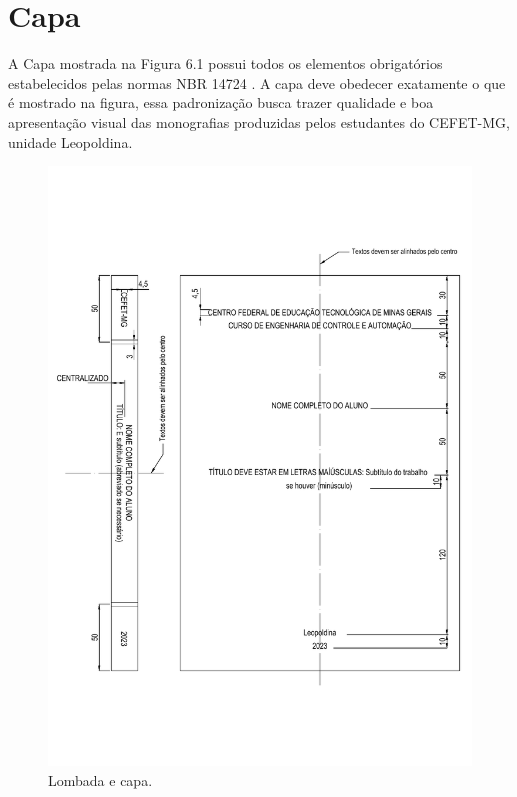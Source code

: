 \documentclass[
        oneside,      %
        english,			
        brazil			 
        ]{configcefetmglpd}
\begin{document}
\section{Capa}
A Capa mostrada na Figura 6.1 possui todos os elementos obrigatórios estabelecidos pelas normas NBR 14724 \cite{bib:abnt14724}. 
A capa deve obedecer exatamente o que é mostrado na figura, essa padronização busca trazer qualidade e boa apresentação visual das monografias produzidas pelos estudantes do CEFET-MG, unidade Leopoldina.

\begin{figure}[h]
	\larguratexto{15cm}  %
	\caption{Lombada e capa.}
	\label{fig:lombada}
	\begin{center}
		\includegraphics[width=15cm]{lombada.pdf}
	\end{center}
\end{figure}
\end{document}
